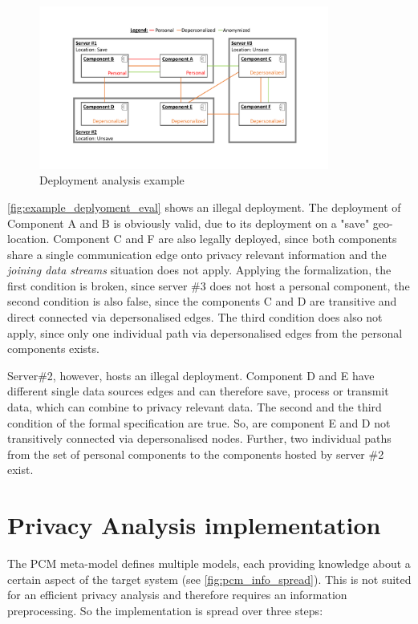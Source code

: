\begin{figure}[h]
	\centering
	\includegraphics[trim = 35mm 30mm 30mm 25mm, clip, width=0.85\textwidth]{graphs/deployment_example_implementation_eval}
	\caption{Deployment analysis example}
	\label{fig:example_deplyoment_eval}
\end{figure}

\autoref{fig:example_deplyoment_eval} shows an illegal deployment. The deployment of Component A and B is obviously valid, due to its deployment on a "save" geo-location. Component C and F are also legally deployed, since both components share a single communication edge onto privacy relevant information and the \textit{joining data streams} situation does not apply. Applying the formalization, the first condition is broken, since server \#3 does not host a personal component, the second condition is also false, since the components C and D are transitive and direct connected via depersonalised edges. The third condition does also not apply, since only one individual path via depersonalised edges from the personal components exists.

Server\#2, however, hosts an illegal deployment. Component D and E have different single data sources edges and can therefore save, process or transmit data, which can combine to privacy relevant data. The second and the third condition of the formal specification are true. So, are component E and D not transitively connected via depersonalised nodes. Further, two individual paths from the set of personal components to the components hosted by server \#2 exist.


\section{Privacy Analysis implementation}
\label{sec:PrivacyAnalysis:implementation}

The PCM meta-model defines multiple models, each providing knowledge about a certain aspect of the target system (see \autoref{fig:pcm_info_spread}). This is not suited for an efficient privacy analysis and therefore requires an information preprocessing. So the implementation is spread over three steps:


